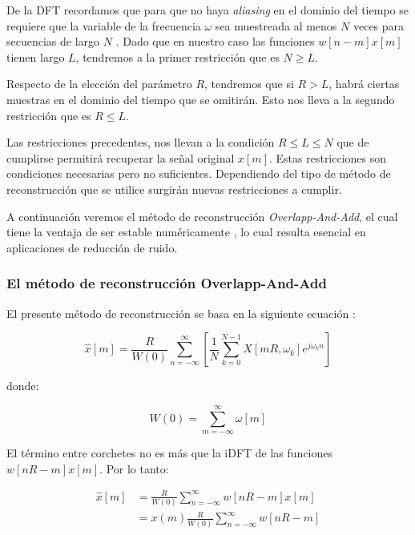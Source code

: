 De la DFT recordamos que para que no haya \emph{aliasing} en el dominio del tiempo se requiere que la variable de la frecuencia $\omega$ sea muestreada al menos $N$ veces para secuencias de largo $N$ \cite{oppenheim_schafer}. Dado que en nuestro caso las funciones $w[n-m] x[m]$ tienen largo $L$, tendremos a la primer restricción que es $N \geq L$.

Respecto de la elección del parámetro $R$, tendremos que si $R>L$, habrá ciertas muestras en el dominio del tiempo que se omitirán. Esto nos lleva a la segundo restricción que es $R \leq L$.

Las restricciones precedentes, nos llevan a la condición $R \leq L \leq N$ que de cumplirse permitirá recuperar la señal original $x[m]$. Estas restricciones son condiciones necesarias pero no suficientes. Dependiendo del tipo de método de reconstrucción que se utilice surgirán nuevas restricciones a cumplir. 

A continuación veremos el método de reconstrucción \emph{Overlapp-And-Add}, el cual tiene la ventaja de ser estable numéricamente \cite{oppenheim_schafer}, lo cual resulta esencial en aplicaciones de reducción de ruido.

\subsubsection{El método de reconstrucción Overlapp-And-Add}
\label{sec:overlapp_and_and}

El presente método de reconstrucción se basa en la siguiente ecuación \cite{jae_sung_oppenheim}:

\begin{equation*}
	\hat{x}[m] = \frac{R}{W(0)} \sum_{n=-\infty}^{\infty} \left[ \frac{1}{N} \sum_{k=0}^{N-1} X[mR, \omega_k] e^{j \omega_k n} \right]
\end{equation*}

\noindent donde:

\begin{equation*}
	W(0) = \sum_{m=-\infty}^{\infty} \omega[m]
\end{equation*}

El término entre corchetes no es más que la iDFT de las funciones $w[nR-m] x[m]$. Por lo tanto:

\begin{align*}
	\hat{x}[m] &= \frac{R}{W(0)} \sum_{n=-\infty}^{\infty} w[nR-m] x[m] \\
	&= x(m) \frac{R}{W(0)} \sum_{n=-\infty}^{\infty} w[nR-m]
\end{align*}

